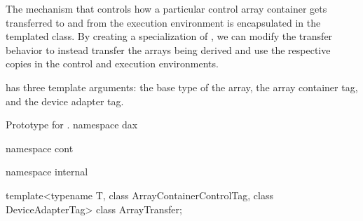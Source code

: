 The mechanism that controls how a particular control array container gets
transferred to and from the execution environment is encapsulated in the
templated  class. By creating a
specialization of , we can modify the
transfer behavior to instead transfer the arrays being derived and use the
respective copies in the control and execution environments.

 has three template arguments: the base type
of the array, the array container tag, and the device adapter tag.

\begin{daxexample}{Prototype for \protect{}.}
namespace dax {
namespace cont {
namespace internal {

template<typename T, class ArrayContainerControlTag, class DeviceAdapterTag>
class ArrayTransfer;

}
}
}
\end{daxexample}

